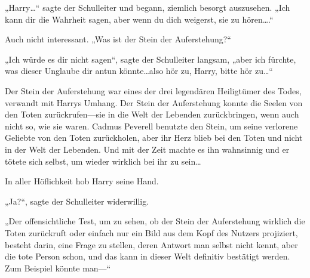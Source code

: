 „Harry…“ sagte der Schulleiter und begann, ziemlich besorgt auszusehen. „Ich kann dir die Wahrheit sagen, aber wenn du dich weigerst, sie zu hören….“

Auch nicht interessant. „Was ist der Stein der Auferstehung?“

„Ich würde es dir nicht sagen“, sagte der Schulleiter langsam, „aber ich fürchte, was dieser Unglaube dir antun könnte…also hör zu, Harry, bitte hör zu…“

Der Stein der Auferstehung war eines der drei legendären Heiligtümer des Todes, verwandt mit Harrys Umhang. Der Stein der Auferstehung konnte die Seelen von den Toten zurückrufen—sie in die Welt der Lebenden zurückbringen, wenn auch nicht so, wie sie waren. Cadmus Peverell benutzte den Stein, um seine verlorene Geliebte von den Toten zurückholen, aber ihr Herz blieb bei den Toten und nicht in der Welt der Lebenden. Und mit der Zeit machte es ihn wahnsinnig und er tötete sich selbst, um wieder wirklich bei ihr zu sein…

In aller Höflichkeit hob Harry seine Hand.

„Ja?“, sagte der Schulleiter widerwillig.

„Der offensichtliche Test, um zu sehen, ob der Stein der Auferstehung wirklich die Toten zurückruft oder einfach nur ein Bild aus dem Kopf des Nutzers projiziert, besteht darin, eine Frage zu stellen, deren Antwort man selbst nicht kennt, aber die tote Person schon, und das kann in dieser Welt definitiv bestätigt werden. Zum Beispiel könnte man—“

